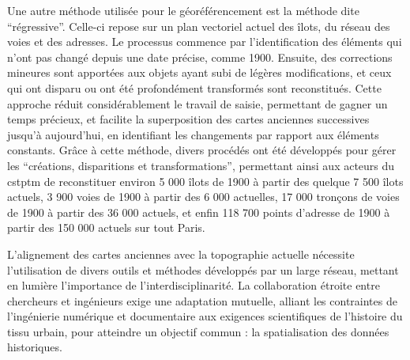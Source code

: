 Une autre méthode utilisée pour le géoréférencement est la méthode dite \enquote{régressive}. Celle-ci repose sur un plan vectoriel actuel des îlots, du réseau des voies et des adresses. Le processus commence par l'identification des éléments qui n'ont pas changé depuis une date précise, comme 1900. Ensuite, des corrections mineures sont apportées aux objets ayant subi de légères modifications, et ceux qui ont disparu ou ont été profondément transformés sont reconstitués. Cette approche réduit considérablement le travail de saisie, permettant de gagner un temps précieux, et facilite la superposition des cartes anciennes successives jusqu'à aujourd'hui, en identifiant les changements par rapport aux éléments constants. Grâce à cette méthode, divers procédés ont été développés pour gérer les \enquote{créations, disparitions et transformations}, permettant ainsi aux acteurs du \acrshort{cstptm} de reconstituer environ 5 000 îlots de 1900 à partir des quelque 7 500 îlots actuels, 3 900 voies de 1900 à partir des 6 000 actuelles, 17 000 tronçons de voies de 1900 à partir des 36 000 actuels, et enfin 118 700 points d’adresse de 1900 à partir des 150 000 actuels sur tout Paris. 

L'alignement des cartes anciennes avec la topographie actuelle nécessite l'utilisation de divers outils et méthodes développés par un large réseau, mettant en lumière l'importance de l'interdisciplinarité. La collaboration étroite entre chercheurs et ingénieurs exige une adaptation mutuelle, alliant les contraintes de l’ingénierie numérique et documentaire aux exigences scientifiques de l’histoire du tissu urbain, pour atteindre un objectif commun : la spatialisation des données historiques.



